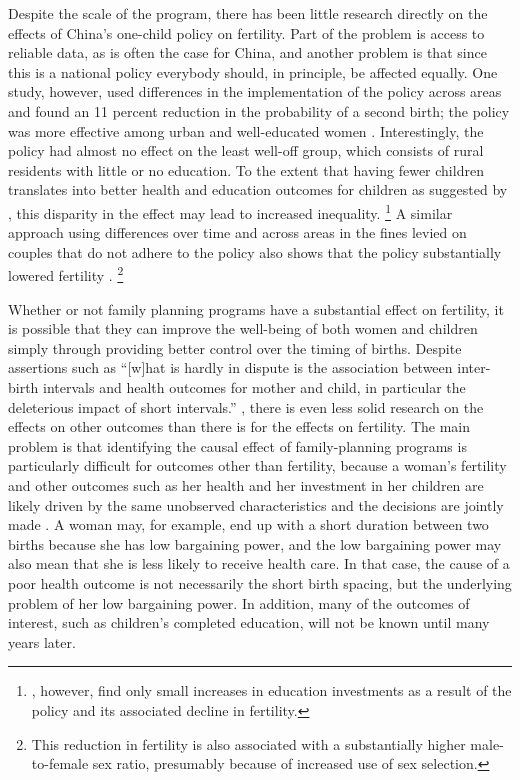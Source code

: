 \documentclass[letterpaper,12pt]{article}
\begin{document}
Despite the scale of the program, there has been little research
directly on the effects of China's one-child policy on fertility. 
Part of the problem is access to reliable data, as is often the case for
China, and another problem is that since this is a national policy
everybody should, in principle, be affected equally. 
One study, however, used differences in the implementation of the policy
across areas and found an 11 percent reduction in the probability of a
second birth; the policy was more effective among urban and
well-educated women \citep{Li2005}. 
Interestingly, the policy had almost no eﬀect on the least well-oﬀ
group, which consists of rural residents with little or no education. 
To the extent that having fewer children translates into better health
and education outcomes for children as suggested by \citet{becker73},
this disparity in the effect may lead to increased inequality.%
\footnote{
\citet{Rosenzweig2009}, however, find only small increases in education
investments as a result of the policy and its associated decline in
fertility.} 
A similar approach using differences over time and across areas in the
fines levied on couples that do not adhere to the policy also shows that
the policy substantially lowered fertility \citep{Ebenstein2010}.%
\footnote{
This reduction in fertility is also associated with a substantially
higher male-to-female sex ratio, presumably because of increased use of
sex selection.}

Whether or not family planning programs have a substantial effect on
fertility, it is possible that they can improve the well-being of both
women and children simply through providing better control over the
timing of births. 
Despite assertions such as ``{[}w{]}hat is hardly in dispute is the
association between inter-birth intervals and health outcomes for mother
and child, in particular the deleterious impact of short intervals.''
\citep[p. 
175]{Casterline2016}, there is even less solid research on the effects
on other outcomes than there is for the effects on fertility. 
The main problem is that identifying the causal effect of
family-planning programs is particularly difficult for outcomes other
than fertility, because a woman's fertility and other outcomes such as
her health and her investment in her children are likely driven by the
same unobserved characteristics and the decisions are jointly made
\citep{Schultz2005}. 
A woman may, for example, end up with a short duration between two
births because she has low bargaining power, and the low bargaining
power may also mean that she is less likely to receive health care. 
In that case, the cause of a poor health outcome is not necessarily the
short birth spacing, but the underlying problem of her low bargaining
power. 
In addition, many of the outcomes of interest, such as children's
completed education, will not be known until many years later.
\end{document}
